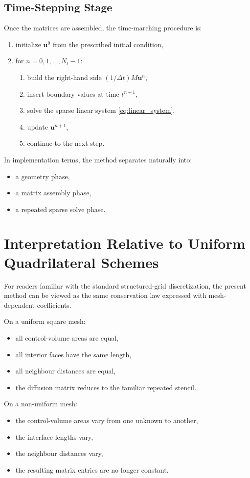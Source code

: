 \documentclass[11pt]{article}
\theoremstyle{plain}
\theoremstyle{definition}
\theoremstyle{remark}
\numberwithin{equation}{section}
\begin{document}
\subsection{Time-Stepping Stage}
Once the matrices are assembled, the time-marching procedure is:
\begin{enumerate}[label=\arabic*.]
\item initialize $\bm{u}^0$ from the prescribed initial condition,
\item for $n=0,1,\dots,N_t-1$:
  \begin{enumerate}[label=\alph*.]
  \item build the right-hand side $(1/\Delta t) M \bm{u}^n$,
  \item insert boundary values at time $t^{n+1}$,
  \item solve the sparse linear system \cref{eq:linear_system},
  \item update $\bm{u}^{n+1}$,
  \item continue to the next step.
  \end{enumerate}
\end{enumerate}

In implementation terms, the method separates naturally into:
\begin{itemize}
\item a geometry phase,
\item a matrix assembly phase,
\item a repeated sparse solve phase.
\end{itemize}

\section{Interpretation Relative to Uniform Quadrilateral Schemes}
For readers familiar with the standard structured-grid discretization, the present method can be viewed as the same conservation law expressed with mesh-dependent coefficients.

On a uniform square mesh:
\begin{itemize}
\item all control-volume areas are equal,
\item all interior faces have the same length,
\item all neighbour distances are equal,
\item the diffusion matrix reduces to the familiar repeated stencil.
\end{itemize}

On a non-uniform mesh:
\begin{itemize}
\item the control-volume areas vary from one unknown to another,
\item the interface lengths vary,
\item the neighbour distances vary,
\item the resulting matrix entries are no longer constant.
\end{itemize}
\end{document}

